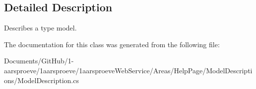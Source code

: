 \subsection{Detailed Description}
Describes a type model. 



The documentation for this class was generated from the following file\+:\begin{DoxyCompactItemize}
\item 
Documents/\+Git\+Hub/1-\/aarsproeve/1aarsproeve/1aarsproeve\+Web\+Service/\+Areas/\+Help\+Page/\+Model\+Descriptions/Model\+Description.\+cs\end{DoxyCompactItemize}
